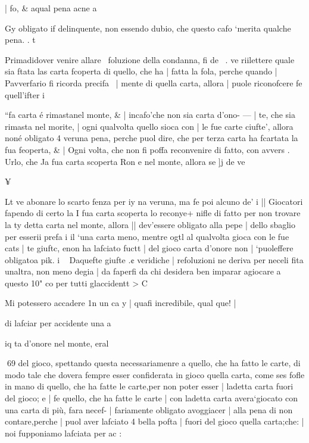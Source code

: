 \documentclass[12pt,a6paper]{article}
\begin{document}
| fo, & aqual pena acne a

 

 

 

 

 

 
  
  

Gy
obligato if delinquente, non
essendo dubio, che questo cafo
‘merita qualche pena. . t

Primadidover venire allare~
foluzione della condanna, fi de~ .
ve riilettere quale sia ftata las
carta fcoperta di quello, che ha |
fatta la fola, perche quando |
Pavverfario fi ricorda precifa~ |
mente di quella carta, allora |
puole riconofcere fe quell’ifter i

“fa carta é rimastanel monte, & |
incafo'che non sia carta d’ono- — |
te, che sia rimasta nel morite, |
ogni qualvolta quello sioca con |
le fue carte ciufte’, allora noné
obligato 4 veruna pena, perche
puol dire, che per terza carta
ha fcartata la fua feoperta, & |
Ogni volta, che non fi poffa reconvenire di fatto, con avvers
. Urlo, che Ja fua carta scoperta
Ron e nel monte, allora se ]j de
ve

 

 

¥

 
 

Lt ve abonare lo scarto fenza per
iy na veruna, ma fe poi alcuno de’
i || Giocatori fapendo di certo la
I fua carta scoperta lo reconye+ nifle di fatto per non trovare la
ty detta carta nel monte, allora
|| dev’essere obligato alla pepe
| dello sbaglio per esserii prefa
i il ‘una carta meno, mentre ogtl
al qualvolta gioca con le fue cats
| te giuftc, enon ha lafciato fuctt
| del gioco carta d’onore non
| ‘puoleffere obligatoa pik.
i ~ Daquefte giufte .¢ veridiche
| refoluzioni ne deriva per neceli fita unaltra, non meno degia
| da faperfi da chi desidera ben
imparar agiocare a questo 10"
co per tutti glaccidentt > C

Mi potessero accadere 1n un ca y
| quafi incredibile, qual que!
|

 

 

di lafciar per accidente una a

iq ta d’onore nel monte, eral

 

 

 

 
69
del gioco, spettando questa necessariamenre a quello, che ha
fatto le carte, di modo tale che
dovera fempre esser confiderata
in gioco quella carta, come ses
fofle in mano di quello, che ha
fatte le carte,per non poter esser |
ladetta carta fuori del gioco; e |
fe quello, che ha fatte le carte |
con ladetta carta avera‘giocato
con una carta di più, fara necef- |
fariamente obligato avoggiacer |
alla pena di non contare,perche |
puol aver lafciato 4 bella pofta |
fuori del gioco quella carta;che: |
noi fupponiamo lafciata per ac
:
\end{document}
